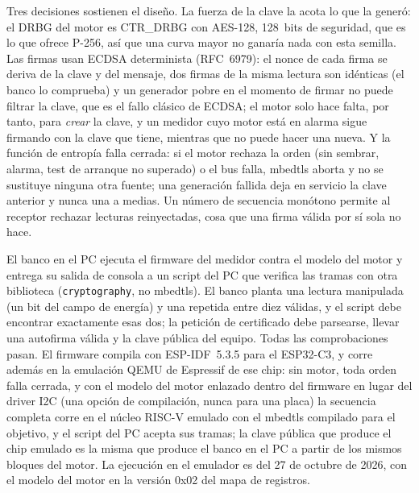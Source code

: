 Tres decisiones sostienen el diseño. La fuerza de la clave la acota lo
que la generó: el \ac{DRBG} del motor es CTR\_DRBG con AES-128, 128~bits
de seguridad, que es lo que ofrece P-256, así que una curva mayor no
ganaría nada con esta semilla. Las firmas usan ECDSA determinista
(RFC~6979): el nonce de cada firma se deriva de la clave y del mensaje,
dos firmas de la misma lectura son idénticas (el banco lo comprueba) y
un generador pobre en el momento de firmar no puede filtrar la clave,
que es el fallo clásico de ECDSA; el motor solo hace falta, por tanto,
para \emph{crear} la clave, y un medidor cuyo motor está en alarma sigue
firmando con la clave que tiene, mientras que no puede hacer una nueva.
Y la función de entropía falla cerrada: si el motor rechaza la orden
(sin sembrar, alarma, test de arranque no superado) o el bus falla,
mbedtls aborta y no se sustituye ninguna otra fuente; una generación
fallida deja en servicio la clave anterior y nunca una a medias. Un
número de secuencia monótono permite al receptor rechazar lecturas
reinyectadas, cosa que una firma válida por sí sola no hace.

El banco en el PC ejecuta el firmware del medidor contra el modelo del
motor y entrega su salida de consola a un script del PC que verifica las
tramas con otra biblioteca (\texttt{cryptography}, no mbedtls). El banco
planta una lectura manipulada (un bit del campo de energía) y una
repetida entre diez válidas, y el script debe encontrar exactamente esas
dos; la petición de certificado debe parsearse, llevar una autofirma
válida y la clave pública del equipo. Todas las comprobaciones pasan. El
firmware compila con ESP-IDF~5.3.5 para el ESP32-C3, y corre además en
la emulación QEMU de Espressif de ese chip: sin motor, toda orden falla
cerrada, y con el modelo del motor enlazado dentro del firmware en lugar
del driver \ac{I2C} (una opción de compilación, nunca para una placa) la
secuencia completa corre en el núcleo RISC-V emulado con el mbedtls
compilado para el objetivo, y el script del PC acepta sus tramas; la
clave pública que produce el chip emulado es la misma que produce el
banco en el PC a partir de los mismos bloques del motor. La ejecución en
el emulador es del 27 de octubre de 2026, con el modelo del motor en la
versión 0x02 del mapa de registros.

